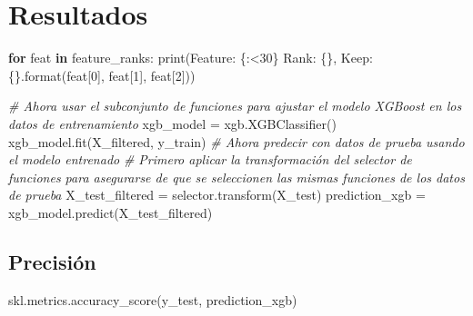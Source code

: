 \documentclass[
]{article}
\newenvironment{Shaded}{}{}
\newcommand{\BuiltInTok}[1]{#1}
\newcommand{\CommentTok}[1]{\textcolor[rgb]{0.38,0.63,0.69}{\textit{#1}}}
\newcommand{\ControlFlowTok}[1]{\textcolor[rgb]{0.00,0.44,0.13}{\textbf{#1}}}
\newcommand{\DecValTok}[1]{\textcolor[rgb]{0.25,0.63,0.44}{#1}}
\newcommand{\KeywordTok}[1]{\textcolor[rgb]{0.00,0.44,0.13}{\textbf{#1}}}
\newcommand{\NormalTok}[1]{#1}
\newcommand{\OperatorTok}[1]{\textcolor[rgb]{0.40,0.40,0.40}{#1}}
\newcommand{\SpecialCharTok}[1]{\textcolor[rgb]{0.25,0.44,0.63}{#1}}
\newcommand{\StringTok}[1]{\textcolor[rgb]{0.25,0.44,0.63}{#1}}
\begin{document}
\hypertarget{resultados}{%
\section{Resultados}\label{resultados}}

\begin{Shaded}
\begin{Highlighting}[]
\ControlFlowTok{for}\NormalTok{ feat }\KeywordTok{in}\NormalTok{ feature\_ranks:}
    \BuiltInTok{print}\NormalTok{(}\StringTok{\textquotesingle{}Feature: }\SpecialCharTok{\{:\textless{}30\}}\StringTok{ Rank: }\SpecialCharTok{\{\}}\StringTok{,  Keep: }\SpecialCharTok{\{\}}\StringTok{\textquotesingle{}}\NormalTok{.}\BuiltInTok{format}\NormalTok{(feat[}\DecValTok{0}\NormalTok{], feat[}\DecValTok{1}\NormalTok{], feat[}\DecValTok{2}\NormalTok{]))}
\end{Highlighting}
\end{Shaded}

\begin{Shaded}
\begin{Highlighting}[]
\CommentTok{\# Ahora usar el subconjunto de funciones para ajustar el modelo XGBoost en los datos de entrenamiento}
\NormalTok{xgb\_model }\OperatorTok{=}\NormalTok{ xgb.XGBClassifier()}
\NormalTok{xgb\_model.fit(X\_filtered, y\_train)}
\CommentTok{\# Ahora predecir con datos de prueba usando el modelo entrenado}
\CommentTok{\# Primero aplicar la transformación del selector de funciones para asegurarse de que se seleccionen las mismas funciones de los datos de prueba}
\NormalTok{X\_test\_filtered }\OperatorTok{=}\NormalTok{ selector.transform(X\_test)}
\NormalTok{prediction\_xgb }\OperatorTok{=}\NormalTok{ xgb\_model.predict(X\_test\_filtered)}
\end{Highlighting}
\end{Shaded}

\hypertarget{precisiuxf3n}{%
\subsection{Precisión}\label{precisiuxf3n}}

\begin{Shaded}
\begin{Highlighting}[]
\NormalTok{skl.metrics.accuracy\_score(y\_test, prediction\_xgb)}
\end{Highlighting}
\end{Shaded}
\end{document}
